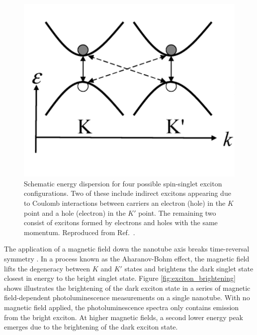 \begin{figure}[ht]
	\centering
	\includegraphics[scale=0.4]{images/chapter_optical_props/exciton_schematic_srivastava}
	\caption{Schematic energy dispersion for four possible spin-singlet exciton configurations. Two of these include indirect excitons appearing due to Coulomb interactions between carriers an electron (hole) in the $K$ point and a hole (electron) in the $K'$ point. The remaining two consist of excitons formed by electrons and holes with the same momentum. Reproduced from Ref.\ \cite{srivastava2008direct}.}
	\label{fig:exciton_transitions}
\end{figure}

The application of a magnetic field down the nanotube axis breaks time-reversal symmetry \cite{srivastava2008direct}. In a process known as the Aharanov-Bohm effect, the magnetic field lifts the degeneracy between $K$ and $K'$ states and brightens the dark singlet state closest in energy to the bright singlet state. Figure \ref{fig:exciton_brightening} shows illustrates the brightening of the dark exciton state in a series of magnetic field-dependent photoluminescence measurements on a single nanotube. With no magnetic field applied, the photoluminescence spectra only contains emission from the bright exciton. At higher magnetic fields, a second lower energy peak emerges due to the brightening of the dark exciton state.

